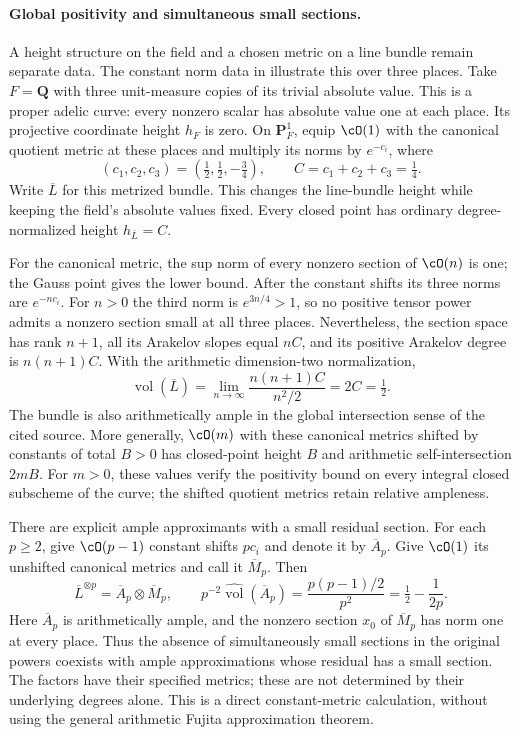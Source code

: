 \paragraph{Global positivity and simultaneous small sections.}

A height structure on the field and a chosen metric on a line bundle
remain separate data.  The constant norm data in
\cite[Example~4.4]{Liu26AdelicFujitaV4} illustrate this over three places.
Take $F=\mathbf Q$ with three unit-measure copies of its trivial absolute
value.  This is a proper adelic curve: every nonzero scalar has absolute
value one at each place.  Its projective coordinate height $h_F$ is zero.
On $\mathbf P^1_F$, equip $\cO(1)$ with the canonical quotient metric at
these places and multiply its norms by $e^{-c_i}$, where
\[
  (c_1,c_2,c_3)=\left(\tfrac12,\tfrac12,-\tfrac34\right),
  \qquad C=c_1+c_2+c_3=\tfrac14.
\]
Write $\overline L$ for this metrized bundle.  This changes the line-bundle
height while keeping the field's absolute values fixed.  Every closed
point has ordinary degree-normalized height $h_{\overline L}=C$.

For the canonical metric, the sup norm of every nonzero section of
$\cO(n)$ is one; the Gauss point gives the lower bound.  After the
constant shifts its three norms are $e^{-nc_i}$.  For $n>0$ the third
norm is $e^{3n/4}>1$, so no positive tensor power admits a nonzero section
small at all three places.  Nevertheless, the section space has rank
$n+1$, all its Arakelov slopes equal $nC$, and its positive Arakelov
degree is $n(n+1)C$.  With the arithmetic dimension-two normalization,
\[
  \widehat{\operatorname{vol}}(\overline L)
    =\lim_{n\to\infty}\frac{n(n+1)C}{n^2/2}=2C=\tfrac12.
\]
The bundle is also arithmetically ample in the global intersection sense
of the cited source.  More generally, $\cO(m)$ with these canonical
metrics shifted by constants of total $B>0$ has closed-point height $B$
and arithmetic self-intersection $2mB$.  For $m>0$, these values verify
the positivity bound on every integral closed subscheme of the curve;
the shifted quotient metrics retain relative ampleness.

There are explicit ample approximants with a small residual section.
For each $p\geq2$, give $\cO(p-1)$ constant shifts $pc_i$ and denote it
by $\overline A_p$.  Give $\cO(1)$ its unshifted canonical metrics and
call it $\overline M_p$.  Then
\[
  \overline L^{\otimes p}=\overline A_p\otimes\overline M_p,
  \qquad
  p^{-2}\widehat{\operatorname{vol}}(\overline A_p)
      =\frac{p(p-1)/2}{p^2}
      =\tfrac12-\frac1{2p}.
\]
Here $\overline A_p$ is arithmetically ample, and the nonzero section
$x_0$ of $\overline M_p$ has norm one at every place.  Thus the absence
of simultaneously small sections in the original powers coexists with
ample approximations whose residual has a small section.  The factors
have their specified metrics; these are not determined by their
underlying degrees alone.  This is a direct constant-metric calculation,
without using the general arithmetic Fujita approximation theorem.

